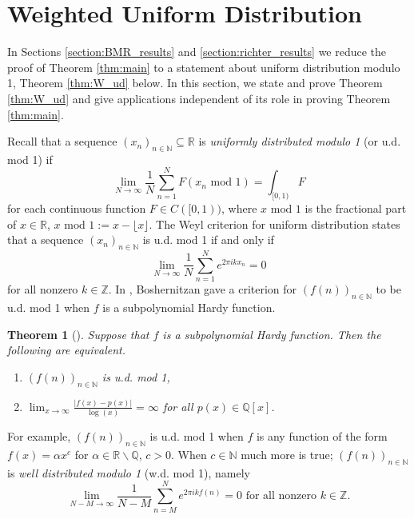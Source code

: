 \documentclass[12pt]{article}
\theoremstyle{plain} %
\newtheorem{theorem}{Theorem}[section]
\theoremstyle{definition} %
\theoremstyle{plain}
\theoremstyle{plain}
\numberwithin{equation}{section}
\newcommand{\N}{\mathbb{N}}
\newcommand{\R}{\mathbb{R}}
\newcommand{\Q}{\mathbb{Q}}
\renewcommand{\setminus}{\backslash}
\renewcommand{\subset}{\subseteq}
\newcommand{\1}{\mathbbm{1}}
\newcommand{\oo}{\infty}
\newcommand{\floor}[1]{\lfloor #1 \rfloor}
\begin{document}
\section{Weighted Uniform Distribution}\label{section:uniform_distribution}


In Sections \ref{section:BMR_results} and \ref{section:richter_results} we reduce the proof of Theorem \ref{thm:main} to a statement about uniform distribution modulo 1, Theorem \ref{thm:W_ud} below. In this section, we state and prove Theorem \ref{thm:W_ud} and give applications independent of its role in proving Theorem \ref{thm:main}.



Recall that a sequence $(x_n)_{n\in \N}\subset \R$ is \emph{uniformly distributed modulo 1} (or u.d. mod 1) if 
\begin{equation}\label{eq:u.d._def}
\lim_{N\to\infty}\frac{1}{N}\sum_{n=1}^NF(x_n\text{ mod }1)= \int_{[0,1)} F
\end{equation}
for each continuous function $F\in C([0,1))$, where $x\text{ mod }1$ is the fractional part of $x\in \R$, $x\text{ mod }1 := x-\floor{x}$. The Weyl criterion for uniform distribution states that a sequence $(x_n)_{n\in \N}$ is u.d. mod 1 if and only if
\begin{equation}\label{eq:u.d._def_2}
\lim_{N\to\infty}\frac{1}{N}\sum_{n=1}^Ne^{2\pi i kx_n}= 0
\end{equation}
for all nonzero $k\in \mathbb{Z}$. In \cite{Boshernitzan}, Boshernitzan gave a criterion for $(f(n))_{n\in \N}$ to be u.d. mod 1 when $f$ is a subpolynomial Hardy function.
\begin{theorem}[{\cite[Theorem 1.3]{Boshernitzan}}]\label{thm:Boshernitzan_ud}
    Suppose that $f$ is a subpolynomial Hardy function. Then the following are equivalent.
    \begin{enumerate}[label=(\arabic*)]
        \item $(f(n))_{n\in \N}$ is u.d. mod 1,
        \item $\lim_{x\to\oo}\frac{|f(x)-p(x)|}{\log(x)}=\oo$ for all $p(x)\in \Q[x]$.
    \end{enumerate}
\end{theorem}
For example, $(f(n))_{n\in \N}$ is u.d. mod 1 when $f$ is any function of the form $f(x) = \alpha x^c$ for $\alpha\in \R\setminus \Q$, $c>0$. When $c\in \N$ much more is true; $(f(n))_{n\in \N}$ is \emph{well distributed modulo 1} (w.d. mod 1), namely
    \begin{equation}
    \lim_{N-M\to\infty}\frac{1}{N-M}\sum_{n=M}^Ne^{2\pi i kf(n)}= 0 \text{ for all nonzero }k\in \mathbb{Z}.
\end{equation}
\end{document}
